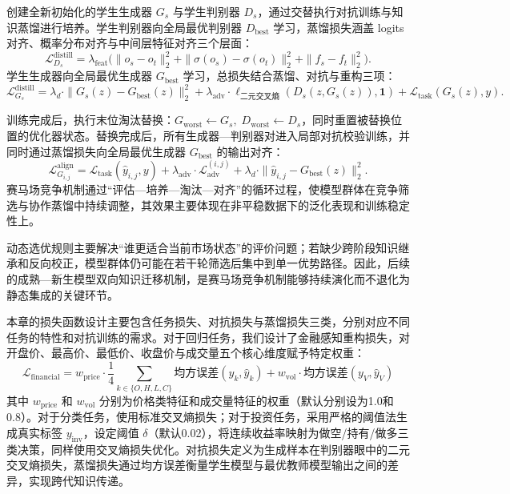 创建全新初始化的学生生成器 $G_s$ 与学生判别器 $D_s$，通过交替执行对抗训练与知识蒸馏进行培养。学生判别器向全局最优判别器 $D_{\text{best}}$ 学习，蒸馏损失涵盖 logits 对齐、概率分布对齐与中间层特征对齐三个层面：
\begin{equation}
\mathcal{L}_{D_s}^{\text{distill}} = \lambda_{\text{feat}}\big(\|o_s - o_t\|_2^2 + \|\sigma(o_s) - \sigma(o_t)\|_2^2 + \|f_s - f_t\|_2^2\big).
\end{equation}
学生生成器向全局最优生成器 $G_{\text{best}}$ 学习，总损失结合蒸馏、对抗与重构三项：
\begin{equation}
\mathcal{L}_{G_s}^{\text{distill}} = \lambda_d \cdot \|G_s(z) - G_{\text{best}}(z)\|_2^2 + \lambda_{\text{adv}} \cdot \ell_{\text{二元交叉熵}}(D_s(z, G_s(z)), \mathbf{1}) + \mathcal{L}_{\text{task}}(G_s(z), y).
\end{equation}


训练完成后，执行末位淘汰替换：$G_{\text{worst}} \leftarrow G_s,\; D_{\text{worst}} \leftarrow D_s$，同时重置被替换位置的优化器状态。替换完成后，所有生成器—判别器对进入局部对抗校验训练，并同时通过蒸馏损失向全局最优生成器 $G_{\text{best}}$ 的输出对齐：
\begin{equation}
\mathcal{L}_{G_{i,j}}^{\text{align}} = \mathcal{L}_{\text{task}}(\hat{y}_{i,j}, y) + \lambda_{\text{adv}} \cdot \mathcal{L}_{\text{adv}}^{(i,j)} + \lambda_d \cdot \|\hat{y}_{i,j} - G_{\text{best}}(z)\|_2^2.
\end{equation}
赛马场竞争机制通过“评估—培养—淘汰—对齐”的循环过程，使模型群体在竞争筛选与协作蒸馏中持续调整，其效果主要体现在非平稳数据下的泛化表现和训练稳定性上。

动态选优规则主要解决“谁更适合当前市场状态”的评价问题；若缺少跨阶段知识继承和反向校正，模型群体仍可能在若干轮筛选后集中到单一优势路径。因此，后续的成熟—新生模型双向知识迁移机制，是赛马场竞争机制能够持续演化而不退化为静态集成的关键环节。

本章的损失函数设计主要包含任务损失、对抗损失与蒸馏损失三类，分别对应不同任务的特性和对抗训练的需求。对于回归任务，我们设计了金融感知重构损失，对开盘价、最高价、最低价、收盘价与成交量五个核心维度赋予特定权重：
\begin{equation}
\mathcal{L}_{\text{financial}} = w_{\text{price}} \cdot \frac{1}{4} \sum_{k \in \{O,H,L,C\}} \text{均方误差}(y_k, \hat{y}_k) + w_{\text{vol}} \cdot \text{均方误差}(y_V, \hat{y}_V)
\end{equation}
其中 $w_{\text{price}}$ 和 $w_{\text{vol}}$ 分别为价格类特征和成交量特征的权重（默认分别设为1.0和0.8）。对于分类任务，使用标准交叉熵损失；对于投资任务，采用严格的阈值法生成真实标签 $y_{\text{inv}}$，设定阈值 $\delta$（默认0.02），将连续收益率映射为做空/持有/做多三类决策，同样使用交叉熵损失优化。对抗损失定义为生成样本在判别器眼中的二元交叉熵损失，蒸馏损失通过均方误差衡量学生模型与最优教师模型输出之间的差异，实现跨代知识传递。

